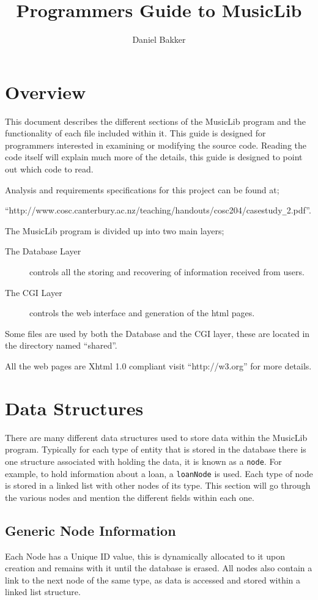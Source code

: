 \documentclass{article}
\title{Programmers Guide to MusicLib}
\author{Daniel Bakker}
\begin{document}
\maketitle
\newpage
\tableofcontents
\newpage
\section{Overview}
This document describes the different sections of the MusicLib program and the functionality of each file included within it. This guide is designed for programmers interested in examining or modifying the source code. Reading the code itself will explain much more of the details, this guide is designed to point out which code to read.

Analysis and requirements specifications for this project can be found at;

``http://www.cosc.canterbury.ac.nz/teaching/handouts/cosc204/casestudy\verb|_|2.pdf''.


The MusicLib program is divided up into two main layers;
\begin{description} 
\item[The Database Layer] controls all the storing and recovering of information received from users.
\item[The CGI Layer] controls the web interface and generation of the html pages.
\end{description}

Some files are used by both the Database and the CGI layer, these are located in the directory named ``shared''.

All the web pages are Xhtml 1.0 compliant visit ``http://w3.org'' for more details.

\section{Data Structures}
There are many different data structures used to store data within the MusicLib program. Typically for each type of entity that is stored in the database there is one structure associated with holding the data, it is known as a \verb|node|. For example, to hold information about a loan, a \verb|loanNode| is used.
Each type of node is stored in a linked list with other nodes of its type. This section will go through the various nodes and mention the different fields within each one.
\subsection{Generic Node Information}
Each Node has a Unique ID value, this is dynamically allocated to it upon creation and remains with it until the database is erased. All nodes  also contain a link to the next node of the same type, as data is accessed and stored within a linked list structure. 
\end{document}
